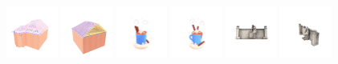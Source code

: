 \begin{figure}[htbp]
  \includegraphics[width=0.15\textwidth]{images/data/samples/19.1.jpeg}\hspace{0.01\textwidth}%
  \includegraphics[width=0.15\textwidth]{images/data/samples/19.2.jpeg}\hfill
  \includegraphics[width=0.15\textwidth]{images/data/samples/20.1.jpeg}\hspace{0.01\textwidth}%
  \includegraphics[width=0.15\textwidth]{images/data/samples/20.2.jpeg}\hfill
  \includegraphics[width=0.15\textwidth]{images/data/samples/21.1.jpeg}\hspace{0.01\textwidth}%
  \includegraphics[width=0.15\textwidth]{images/data/samples/21.2.jpeg} \\\\
  \vspace{2mm}


\end{figure}
